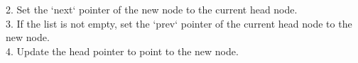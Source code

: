 \documentclass[preview]{standalone}
\begin{document}
2. Set the `next` pointer of the new node to the current head node.\\3. If the list is not empty, set the `prev` pointer of the current head node to the new node.\\4. Update the head pointer to point to the new node.\\
\end{document}
